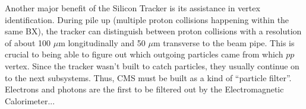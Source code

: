 Another major benefit of the Silicon Tracker is its assistance in vertex identification.
During pile up (multiple proton collisions happening within the same BX),
the tracker can distinguish between proton collisions with a resolution of about 
100 $\mu$m longitudinally and 50 $\mu$m transverse to the beam pipe.
This is crucial to being able to figure out which outgoing particles came from which $pp$ vertex.
Since the tracker wasn't built to catch particles, they usually continue on to the next subsystems.
Thus, CMS must be built as a kind of ``particle filter''.
Electrons and photons are the first to be filtered out by the Electromagnetic Calorimeter...
